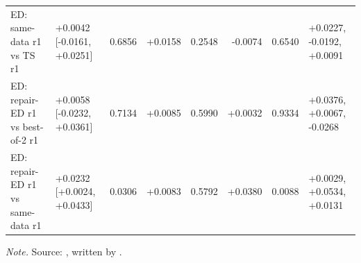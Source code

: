 \begin{landscape}
{\begin{longtable}{@{}p{5.4cm}lrrrrrp{3.8cm}@{}}
ED: same-data r1 vs TS r1 & +0.0042 [-0.0161, +0.0251] & 0.6856 & +0.0158 & 0.2548 & -0.0074 & 0.6540 & +0.0227, -0.0192, +0.0091\\
ED: repair-ED r1 vs best-of-2 r1 & +0.0058 [-0.0232, +0.0361] & 0.7134 & +0.0085 & 0.5990 & +0.0032 & 0.9334 & +0.0376, +0.0067, -0.0268\\
ED: repair-ED r1 vs same-data r1 & +0.0232 [+0.0024, +0.0433] & 0.0306 & +0.0083 & 0.5792 & +0.0380 & 0.0088 & +0.0029, +0.0534, +0.0131\\
\end{longtable}
}
\vspace{-0.6\baselineskip}
{\footnotesize\color{slate}\textit{Note.} Source: , written by .\par}
\medskip
\end{landscape}
